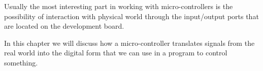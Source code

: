 \documentclass[../sparc.tex]{subfiles}
\begin{document}
\begin{figure}[ht]
  \centering
\end{figure}

Usually the most interesting part in working with micro-controllers is the
possibility of interaction with physical world through the input/output ports
that are located on the development board.

In this chapter we will discuss how a micro-controller translates signals from
the real world into the digital form that we can use in a program to control
something.
\end{document}
